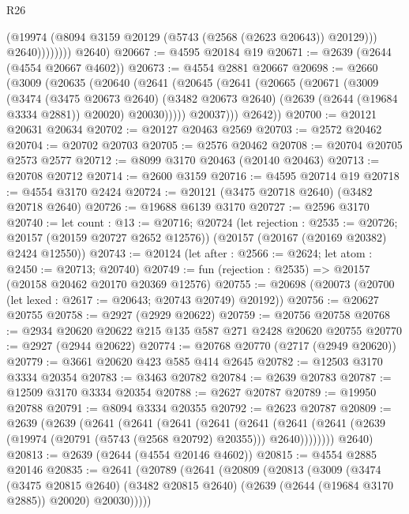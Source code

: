 \begin{lexlean}{R26}
\begin{coremodule}
                      (@19974 (@8094 @3159 @20129 (@5743 (@2568 (@2623 @20643)) @20129)))
                      @2640))))))))
      @2640)
@20667 := @4595 @20184 @19
@20671 := @2639 (@2644 (@4554 @20667 @4602))
@20673 := @4554 @2881 @20667
@20698 := @2660
    (@3009
      (@20635
        (@20640
          (@2641
            (@20645
              (@2641
                (@20665
                  (@20671
                    (@3009
                      (@3474
                        (@3475 @20673 @2640)
                        (@3482 @20673 @2640)
                        (@2639 (@2644 (@19684 @3334 @2881)) @20020)
                        @20030)))))
              @20037)))
        @2642))
@20700 := @20121 @20631 @20634
@20702 := @20127 @20463 @2569
@20703 := @2572 @20462
@20704 := @20702 @20703
@20705 := @2576 @20462
@20708 := @20704 @20705 @2573 @2577
@20712 := @8099 @3170 @20463 (@20140 @20463)
@20713 := @20708 @20712
@20714 := @2600 @3159
@20716 := @4595 @20714 @19
@20718 := @4554 @3170 @2424
@20724 := @20121 (@3475 @20718 @2640) (@3482 @20718 @2640)
@20726 := @19688 @6139 @3170
@20727 := @2596 @3170
@20740 := let count : @13 := @20716;
  @20724
    (let rejection : @2535 := @20726; @20157 (@20159 @20727 @2652 @12576))
    (@20157 (@20167 (@20169 @20382) @2424 @12550))
@20743 := @20124 (let after : @2566 := @2624; let atom : @2450 := @20713; @20740)
@20749 := fun (rejection : @2535) => @20157 (@20158 @20462 @20170 @20369 @12576)
@20755 := @20698 (@20073 (@20700 (let lexed : @2617 := @20643; @20743 @20749) @20192))
@20756 := @20627 @20755
@20758 := @2927 (@2929 @20622)
@20759 := @20756 @20758
@20768 := @2934 @20620 @20622 @215 @135 @587 @271 @2428 @20620 @20755
@20770 := @2927 (@2944 @20622)
@20774 := @20768 @20770 (@2717 (@2949 @20620))
@20779 := @3661 @20620 @423 @585 @414 @2645
@20782 := @12503 @3170 @3334 @20354
@20783 := @3463 @20782
@20784 := @2639 @20783
@20787 := @12509 @3170 @3334 @20354
@20788 := @2627 @20787
@20789 := @19950 @20788
@20791 := @8094 @3334 @20355
@20792 := @2623 @20787
@20809 := @2639
    (@2639
      (@2641
        (@2641
          (@2641
            (@2641
              (@2641
                (@2641 (@2641 (@2639 (@19974 (@20791 (@5743 (@2568 @20792) @20355))) @2640))))))))
      @2640)
@20813 := @2639 (@2644 (@4554 @20146 @4602))
@20815 := @4554 @2885 @20146
@20835 := @2641
    (@20789
      (@2641
        (@20809
          (@20813
            (@3009
              (@3474
                (@3475 @20815 @2640)
                (@3482 @20815 @2640)
                (@2639 (@2644 (@19684 @3170 @2885)) @20020)
                @20030)))))

\end{coremodule}
\end{lexlean}
